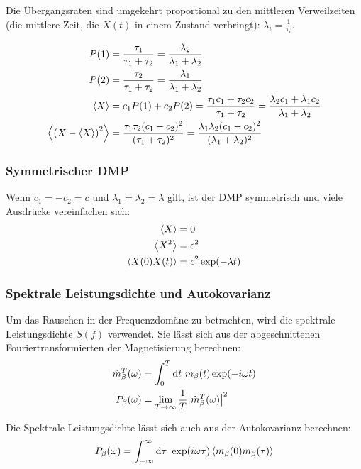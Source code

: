 \documentclass[main.tex]{subfiles}
\begin{document}
Die Übergangsraten sind umgekehrt proportional zu den mittleren Verweilzeiten
(die mittlere Zeit, die \(X(t)\) in einem Zustand verbringt): \(\lambda_i =
\frac{1}{\tau_i}\).

\begin{align}
	P(1)                            & = \frac{\tau_1}{\tau_1 + \tau_2} =
	\frac{\lambda_2 }{\lambda_1 +
		\lambda_2}
	\\
	P(2)                            & = \frac{\tau_2}{\tau_1 + \tau_2} =
	\frac{\lambda_1 }{\lambda_1 +
		\lambda_2}
	\\
	\expval{X}                      & = c_1 P(1) + c_2 P(2) = \frac{\tau_1
		c_1 + \tau_2
		c_2}{\tau_1 + \tau_2} = \frac{\lambda_2 c_1 + \lambda_1
		c_2}{\lambda_1 +
		\lambda_2}
	\\
	\expval{\qty(X - \expval{X})^2} & = \frac{\tau_1 \tau_2
		(c_1-c_2)^2}{(\tau_1 + \tau_2)^2} = \frac{\lambda_1 \lambda_2
		(c_1-c_2)^2}{(\lambda_1 + \lambda_2)^2}
\end{align}


\subsubsection*{Symmetrischer DMP}

Wenn \(c_1=-c_2=c\) und \(\lambda_1 = \lambda_2 = \lambda\) gilt, ist der DMP
symmetrisch und viele Ausdrücke vereinfachen sich:
\begin{align}
	\expval{X}        & = 0                    \\
	\expval{X^2}      & = c^2                  \\
	\expval{X(0)X(t)} & = c^2 \exp(-\lambda t)
\end{align}\cite{matphys}

\subsubsection*{Spektrale Leistungsdichte und Autokovarianz}

Um das Rauschen in der Frequenzdomäne zu betrachten, wird die spektrale
Leistungsdichte \(S(f)\) verwendet. Sie lässt sich aus der abgeschnittenen
Fouriertransformierten der Magnetisierung berechnen:
\begin{align}
	\hat{m}_\beta^T(\omega) & = \int_0^T \mathrm{d} t \ m_\beta(t) \exp(-i \omega
	t)
	\\
	P_{\beta}(\omega)       & = \lim_{T \to \infty} \frac{1}{T}
	\abs{\hat{m}_\beta^T(\omega)}^2
\end{align}

Die Spektrale Leistungsdichte lässt sich auch aus der Autokovarianz berechnen:
\begin{align}
	P_\beta(\omega) = \int_{-\infty}^{\infty} \mathrm{d} \tau \ \exp(i \omega
	\tau) \expval{m_\beta(0) m_\beta(\tau)}
\end{align}\cite{schlegel-master}

\end{document}

